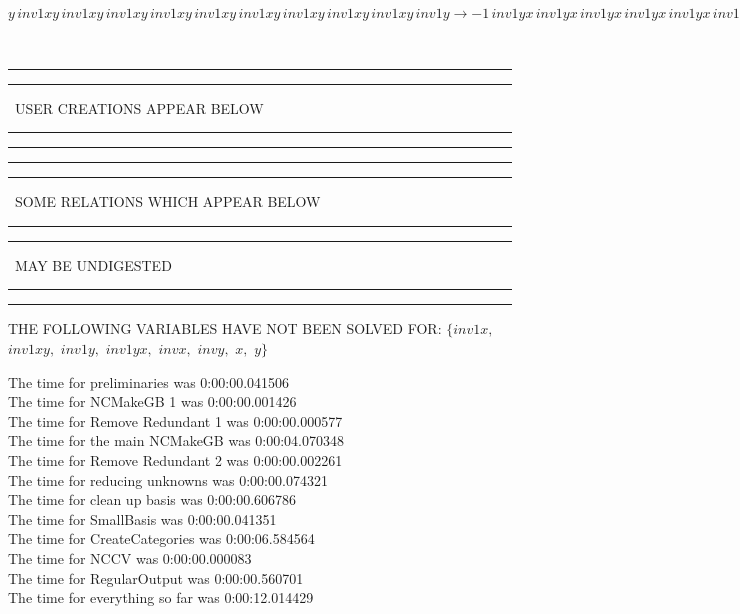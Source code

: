\documentclass[rep10,leqno]{report}
\begin{document}
\begin{minipage}{6in}
$
y\,
 inv1xy\,
 inv1xy\,
 inv1xy\,
 inv1xy\,
 inv1xy\,
 inv1xy\,
 inv1xy\,
 inv1xy\,
 inv1xy\,
 inv1y\rightarrow -1\,
 inv1yx\,
 inv1yx\,
 inv1yx\,
 inv1yx\,
 inv1yx\,
 inv1yx\,
 inv1yx\,
 inv1yx\,
 inv1yx + inv1yx\,
 inv1yx\,
 inv1yx\,
 inv1yx\,
 inv1yx\,
 inv1yx\,
 inv1yx\,
 inv1yx\,
 inv1yx\,
 inv1y
$
\end{minipage}\\
\rule[2pt]{6in}{1pt}\hfil\break
\rule[2.5pt]{1.701in}{1pt}
\ USER CREATIONS APPEAR BELOW\ 
\rule[2.5pt]{1.701in}{1pt}\hfil\break
\rule[2pt]{6in}{1pt}\hfil\break
\rule[2pt]{6in}{4pt}\hfil\break
\rule[2pt]{1.45in}{4pt}
\ SOME RELATIONS WHICH APPEAR BELOW\ 
\rule[2pt]{1.45in}{4pt}\hfil\break
\rule[2pt]{2.18in}{4pt}
\ MAY BE UNDIGESTED\ 
\rule[2pt]{2.18in}{4pt}\hfil\break
\rule[2pt]{6in}{4pt}\hfil\break
THE FOLLOWING VARIABLES HAVE NOT BEEN SOLVED FOR:\hfil\break
$\{inv1x,
$ $
inv1xy,
$ $
inv1y,
$ $
inv1yx,
$ $
invx,
$ $
invy,
$ $
x,
$ $
y\}$
\smallskip\\
\vspace{10pt}

\noindent
The time for preliminaries was 0:00:00.041506\\
The time for NCMakeGB 1 was 0:00:00.001426\\
The time for Remove Redundant 1 was 0:00:00.000577\\
The time for the main NCMakeGB was 0:00:04.070348\\
The time for Remove Redundant 2 was 0:00:00.002261\\
The time for reducing unknowns was 0:00:00.074321\\
The time for clean up basis was 0:00:00.606786\\
The time for SmallBasis was 0:00:00.041351\\
The time for CreateCategories was 0:00:06.584564\\
The time for NCCV was 0:00:00.000083\\
The time for RegularOutput was 0:00:00.560701\\
The time for everything so far was 0:00:12.014429\\
\end{document}
